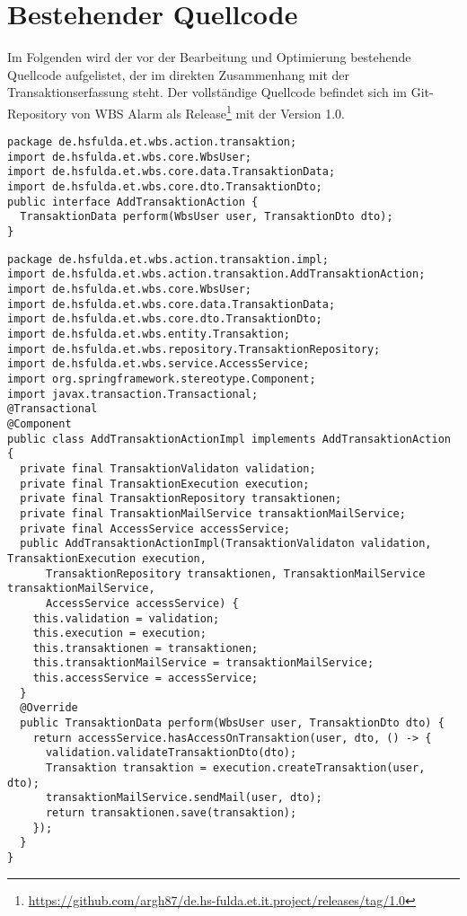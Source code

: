 \chapter{Bestehender Quellcode}
\label{ch:Quellcode}

Im Folgenden wird der vor der Bearbeitung und Optimierung bestehende Quellcode aufgelistet, der im direkten Zusammenhang mit der Transaktionserfassung steht. Der vollständige Quellcode befindet sich im Git-Repository von WBS Alarm als Release\footnote{\url{https://github.com/argh87/de.hs-fulda.et.it.project/releases/tag/1.0}} mit der Version 1.0.

\begin{lstlisting}[caption={Schnittstelle der Aktion zur Erfassung einer Transaktion.}, label={lst:AddTransaktionAction}]
package de.hsfulda.et.wbs.action.transaktion;
import de.hsfulda.et.wbs.core.WbsUser;
import de.hsfulda.et.wbs.core.data.TransaktionData;
import de.hsfulda.et.wbs.core.dto.TransaktionDto;
public interface AddTransaktionAction {
  TransaktionData perform(WbsUser user, TransaktionDto dto);
}
\end{lstlisting}

\begin{lstlisting}[caption={Implementierung der Aktion zum Erfassen der Transaktion.}, label={lst:AddTransaktionActionImpl}]
package de.hsfulda.et.wbs.action.transaktion.impl;
import de.hsfulda.et.wbs.action.transaktion.AddTransaktionAction;
import de.hsfulda.et.wbs.core.WbsUser;
import de.hsfulda.et.wbs.core.data.TransaktionData;
import de.hsfulda.et.wbs.core.dto.TransaktionDto;
import de.hsfulda.et.wbs.entity.Transaktion;
import de.hsfulda.et.wbs.repository.TransaktionRepository;
import de.hsfulda.et.wbs.service.AccessService;
import org.springframework.stereotype.Component;
import javax.transaction.Transactional;
@Transactional
@Component
public class AddTransaktionActionImpl implements AddTransaktionAction {
  private final TransaktionValidaton validation;
  private final TransaktionExecution execution;
  private final TransaktionRepository transaktionen;
  private final TransaktionMailService transaktionMailService;
  private final AccessService accessService;
  public AddTransaktionActionImpl(TransaktionValidaton validation, TransaktionExecution execution,
      TransaktionRepository transaktionen, TransaktionMailService transaktionMailService,
      AccessService accessService) {
    this.validation = validation;
    this.execution = execution;
    this.transaktionen = transaktionen;
    this.transaktionMailService = transaktionMailService;
    this.accessService = accessService;
  }
  @Override
  public TransaktionData perform(WbsUser user, TransaktionDto dto) {
    return accessService.hasAccessOnTransaktion(user, dto, () -> {
      validation.validateTransaktionDto(dto);
      Transaktion transaktion = execution.createTransaktion(user, dto);
      transaktionMailService.sendMail(user, dto);
      return transaktionen.save(transaktion);
    });
  }
}
\end{lstlisting}

